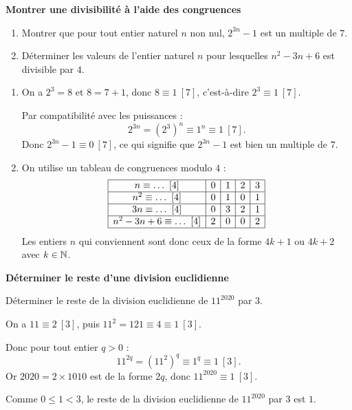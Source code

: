 \exerciceresolu
\textbf{Montrer une divisibilité à l'aide des congruences}

\begin{enumerate}
	\item Montrer que pour tout entier naturel $n$ non nul, $2^{3n} - 1$ est un multiple de $7$.
	\item Déterminer les valeurs de l'entier naturel $n$ pour lesquelles $n^2 - 3n + 6$ est divisible par $4$.
\end{enumerate}

\solution

\begin{enumerate}
	\item On a $2^3 = 8$ et $8 = 7 + 1$, donc $8 \equiv 1\ [7]$, c'est-à-dire $2^3 \equiv 1\ [7]$.

	Par compatibilité avec les puissances :
	$$
	2^{3n} = \left(2^3\right)^n \equiv 1^n \equiv 1\ [7].
	$$
	Donc $2^{3n} - 1 \equiv 0\ [7]$, ce qui signifie que $2^{3n} - 1$ est bien un multiple de $7$.

	\item On utilise un tableau de congruences modulo $4$ :
	\[
	\begin{array}{|c|c|c|c|c|}
		\hline
		n \equiv \ldots\ [4] & 0 & 1 & 2 & 3 \\
		\hline
		n^2 \equiv \ldots\ [4] & 0 & 1 & 0 & 1 \\
		\hline
		3n \equiv \ldots\ [4] & 0 & 3 & 2 & 1 \\
		\hline
		n^2 - 3n + 6 \equiv \ldots\ [4] & 2 & 0 & 0 & 2 \\
		\hline
	\end{array}
	\]
	Les entiers $n$ qui conviennent sont donc ceux de la forme $4k + 1$ ou $4k + 2$ avec $k \in \mathbb{N}$.
\end{enumerate}

\exerciceresolu
\textbf{Déterminer le reste d'une division euclidienne}

Déterminer le reste de la division euclidienne de $11^{2020}$ par $3$.

\solution

On a $11 \equiv 2\ [3]$, puis $11^2 = 121 \equiv 4 \equiv 1\ [3]$.

Donc pour tout entier $q > 0$ :
$$
11^{2q} = \left(11^2\right)^q \equiv 1^q \equiv 1\ [3].
$$
Or $2020 = 2 \times 1010$ est de la forme $2q$, donc $11^{2020} \equiv 1\ [3]$.

Comme $0 \leqslant 1 < 3$, le reste de la division euclidienne de $11^{2020}$ par $3$ est $\boxed{1}$.

